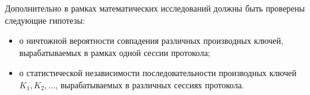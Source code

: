 Дополнительно в рамках математических исследований должны быть проверены следующие гипотезы:

\begin{itemize}
	\item о ничтожной вероятности совпадения различных производных ключей, вырабатываемых в рамках одной сессии протокола;
	\item о статистической независимости последовательности производных ключей $K_1, K_2, ...$, вырабатываемых в различных сессиях протокола.
\end{itemize}